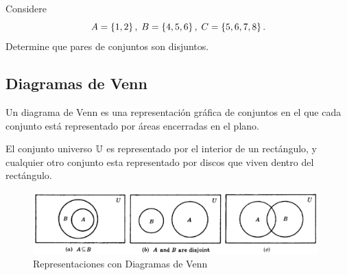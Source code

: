 	\begin{ejemplo}
		Considere $$
		A=\left\{ 1,2 \right\}, \; B=\left\{ 4,5,6 \right\}, \; C=\left\{ 5,6,7,8 \right\}.
		$$
		Determine que pares de conjuntos son disjuntos. 
	\end{ejemplo}
	


\subsection{Diagramas de Venn}


	Un diagrama de Venn es una representación gráfica de conjuntos en el que cada conjunto está representado por áreas encerradas en el plano.



	El conjunto universo $\mathbb{U}$ es representado por el interior de un rectángulo, y cualquier otro conjunto esta representado por discos que viven dentro del rectángulo.



	\begin{figure}
		\centering
		\includegraphics[width=11cm,keepaspectratio=true]{./md/venn01.png}
		\caption{Representaciones con Diagramas de Venn}
		\label{fig:0101}
	\end{figure}
	


%
%


